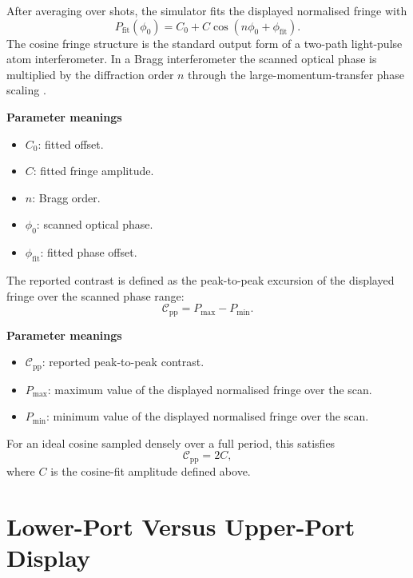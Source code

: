 \documentclass[11pt,a4paper]{article}
\begin{document}
After averaging over shots, the simulator fits the displayed normalised fringe with
\begin{equation}
  P_{\mathrm{fit}}(\phi_0) = C_0 + C\cos(n\phi_0 + \phi_{\mathrm{fit}}).
\end{equation}
The cosine fringe structure is the standard output form of a two-path light-pulse atom interferometer. In a Bragg interferometer the scanned optical phase is multiplied by the diffraction order $n$ through the large-momentum-transfer phase scaling \cite{Giltner1995,Muller2008}.

\textbf{Parameter meanings}
\begin{itemize}[leftmargin=1.5em]
  \item $C_0$: fitted offset.
  \item $C$: fitted fringe amplitude.
  \item $n$: Bragg order.
  \item $\phi_0$: scanned optical phase.
  \item $\phi_{\mathrm{fit}}$: fitted phase offset.
\end{itemize}

The reported contrast is defined as the peak-to-peak excursion of the displayed fringe over the scanned phase range:
\begin{equation}
  \mathcal{C}_{\mathrm{pp}} = P_{\max} - P_{\min}.
\end{equation}

\textbf{Parameter meanings}
\begin{itemize}[leftmargin=1.5em]
  \item $\mathcal{C}_{\mathrm{pp}}$: reported peak-to-peak contrast.
  \item $P_{\max}$: maximum value of the displayed normalised fringe over the scan.
  \item $P_{\min}$: minimum value of the displayed normalised fringe over the scan.
\end{itemize}

For an ideal cosine sampled densely over a full period, this satisfies
\begin{equation}
  \mathcal{C}_{\mathrm{pp}} = 2C,
\end{equation}
where $C$ is the cosine-fit amplitude defined above.

\section{Lower-Port Versus Upper-Port Display}
\end{document}
